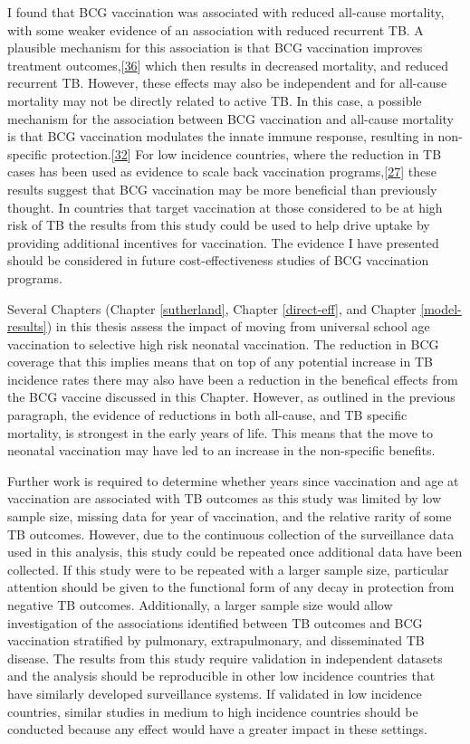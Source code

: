 \documentclass[11pt,twoside]{bristolthesis}
\begin{document}
  I found that BCG vaccination was associated with reduced all-cause mortality, with some weaker evidence of an association with reduced recurrent TB. A plausible mechanism for this association is that BCG vaccination improves treatment outcomes,{[}\protect\hyperlink{ref-Jeremiah2010}{36}{]} which then results in decreased mortality, and reduced recurrent TB. However, these effects may also be independent and for all-cause mortality may not be directly related to active TB. In this case, a possible mechanism for the association between BCG vaccination and all-cause mortality is that BCG vaccination modulates the innate immune response, resulting in non-specific protection.{[}\protect\hyperlink{ref-Kleinnijenhuis2012}{32}{]} For low incidence countries, where the reduction in TB cases has been used as evidence to scale back vaccination programs,{[}\protect\hyperlink{ref-Zwerling2011}{27}{]} these results suggest that BCG vaccination may be more beneficial than previously thought. In countries that target vaccination at those considered to be at high risk of TB the results from this study could be used to help drive uptake by providing additional incentives for vaccination. The evidence I have presented should be considered in future cost-effectiveness studies of BCG vaccination programs.
  
  Several Chapters (Chapter \ref{sutherland}, Chapter \ref{direct-eff}, and Chapter \ref{model-results}) in this thesis assess the impact of moving from universal school age vaccination to selective high risk neonatal vaccination. The reduction in BCG coverage that this implies means that on top of any potential increase in TB incidence rates there may also have been a reduction in the benefical effects from the BCG vaccine discussed in this Chapter. However, as outlined in the previous paragraph, the evidence of reductions in both all-cause, and TB specific mortality, is strongest in the early years of life. This means that the move to neonatal vaccination may have led to an increase in the non-specific benefits.
  
  Further work is required to determine whether years since vaccination and age at vaccination are associated with TB outcomes as this study was limited by low sample size, missing data for year of vaccination, and the relative rarity of some TB outcomes. However, due to the continuous collection of the surveillance data used in this analysis, this study could be repeated once additional data have been collected. If this study were to be repeated with a larger sample size, particular attention should be given to the functional form of any decay in protection from negative TB outcomes. Additionally, a larger sample size would allow investigation of the associations identified between TB outcomes and BCG vaccination stratified by pulmonary, extrapulmonary, and disseminated TB disease. The results from this study require validation in independent datasets and the analysis should be reproducible in other low incidence countries that have similarly developed surveillance systems. If validated in low incidence countries, similar studies in medium to high incidence countries should be conducted because any effect would have a greater impact in these settings.
  
\end{document}
